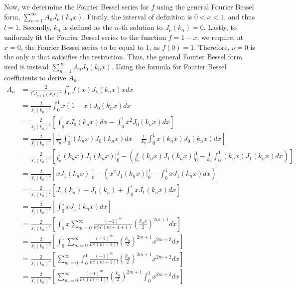 \documentclass[a4paper]{article}
\newcommand{\ds}{\displaystyle}
\begin{document}
\begin{enumerate}
\begin{enumerate}
		\pagebreak

		Now, we determine the Fourier Bessel series for $\ds{f}$ using the general Fourier Bessel form, $\ds{\sum^{\infty}_{n=1}A_nJ_\nu(k_nx)}$. Firstly, the interval of definition is $\ds{0<x<1}$, and thus $\ds{l = 1}$. Secondly, $\ds{k_n}$ is defined as the $\ds{n}$-th solution to $\ds{J_{\nu}(k_n)=0}$. Lastly, to uniformly fit the Fourier Bessel series to the function $\ds{f = 1-x}$, we require, at $\ds{x=0}$, the Fourier Bessel series to be equal to 1, as $\ds{f(0) = 1}$. Therefore, $\ds{\nu = 0}$ is the only $\ds{\nu}$ that satisifies the restriction. Thus, the general Fourier Bessel form used is instead $\ds{\sum^{\infty}_{n=1}A_nJ_0(k_nx)}$. Using the formula for Fourier Bessel coefficients to derive $\ds{A_n}$,
		\begin{align*}
			A_n & = \frac{2}{l^2J_{\nu+1}(k_nl)^2}\int^{l}_{0}f(x)J_{\nu}(k_nx)xdx\\
			& = \frac{2}{J_{1}(k_n)^2}\int^{1}_{0}x(1-x)J_{0}(k_nx)dx\\
			& = \frac{2}{J_{1}(k_n)^2}\left[\int^{1}_{0}xJ_{0}(k_nx)dx - \int^{1}_{0}x^2J_{0}(k_nx)dx\right]\\
			& = \frac{2}{J_{1}(k_n)^2}\left[\frac{1}{k_n}\int^{1}_{0}(k_nx)J_{0}(k_nx)dx - \frac{1}{k_n}\int^{1}_{0}x(k_nx)J_{0}(k_nx)dx\right]\\
			& = \frac{2}{J_{1}(k_n)^2}\left[\frac{1}{k_n}(k_nx)J_{1}(k_nx) \Big|^1_0 - \left(\frac{x}{k_n}(k_nx)J_1(k_nx) \Big|^1_0 - \frac{1}{k_n}\int^{1}_{0}(k_nx)J_{1}(k_nx)dx\right)\right]\\
			& = \frac{2}{J_{1}(k_n)^2}\left[xJ_{1}(k_nx) \Big|^1_0 - \left(x^2J_1(k_nx) \Big|^1_0 - \int^{1}_{0}xJ_{1}(k_nx)dx\right)\right]\\
			& = \frac{2}{J_{1}(k_n)^2}\left[J_{1}(k_n) - J_1(k_n) + \int^{1}_{0}xJ_{1}(k_nx)dx\right]\\
			& = \frac{2}{J_{1}(k_n)^2}\left[\int^{1}_{0}xJ_{1}(k_nx)dx\right]\\
			& = \frac{2}{J_{1}(k_n)^2}\left[\int^{1}_{0}x\sum^{\infty}_{m=0} \frac{(-1)^m}{m!\Gamma(m+1+1)}\left(\frac{k_nx}{2}\right)^{2m+1} dx\right]\\
			& = \frac{2}{J_{1}(k_n)^2}\left[\int^{1}_{0}\sum^{\infty}_{m=0} \frac{(-1)^m}{m!(m+1)!}\left(\frac{k_n}{2}\right)^{2m+1}x^{2m+2} dx\right]\\
			& = \frac{2}{J_{1}(k_n)^2}\left[\sum^{\infty}_{m=0}\int^{1}_{0} \frac{(-1)^m}{m!(m+1)!}\left(\frac{k_n}{2}\right)^{2m+1}x^{2m+2} dx\right]\\
			& = \frac{2}{J_{1}(k_n)^2}\left[\sum^{\infty}_{m=0} \frac{(-1)^m}{m!(m+1)!}\left(\frac{k_n}{2}\right)^{2m+1}\int^{1}_{0}x^{2m+2} dx\right]\\

\end{align*}
\end{enumerate}
\end{enumerate}
\end{document}

